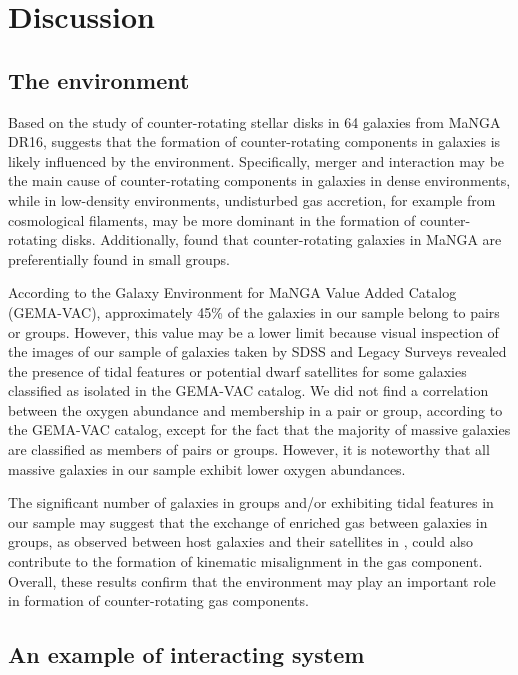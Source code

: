 \documentclass[12pt,preprint]{aa}
\begin{document}
\section{Discussion}
\label{sect:discussion}

\subsection{The environment}

Based on the study of counter-rotating stellar disks in 64 galaxies from MaNGA DR16, \citet{Bevacqua2022} suggests that the formation of counter-rotating components in galaxies is likely influenced by the environment. Specifically, merger and interaction may be the main cause of counter-rotating components in galaxies in dense environments, while in low-density environments, undisturbed gas accretion, for example from cosmological filaments, may be more dominant in the formation of counter-rotating disks. Additionally, \citet{Beom2022} found that counter-rotating galaxies in MaNGA are preferentially found in small groups. 

According to the Galaxy Environment for MaNGA Value Added Catalog (GEMA-VAC), approximately 45\% of the galaxies in our sample belong to pairs or groups. However, this value may be a lower limit because visual inspection of the images of our sample of galaxies taken by SDSS and Legacy Surveys revealed the presence of tidal features or potential dwarf satellites for some galaxies classified as isolated in the GEMA-VAC catalog. We did not find a correlation between the oxygen abundance and membership in a pair or group, according to the GEMA-VAC catalog, except for the fact that the majority of massive galaxies are classified as members of pairs or groups. However, it is noteworthy that all massive galaxies in our sample exhibit lower oxygen abundances.

The significant number of galaxies in groups and/or exhibiting tidal features in our sample may suggest that the exchange of enriched gas between galaxies in groups, as observed between host galaxies and their satellites in \citet{Schaefer2019}, could also contribute to the formation of kinematic misalignment in the gas component. Overall, these results confirm that the environment may play an important role in formation of counter-rotating gas components.


\subsection{An example of interacting system}
\end{document}
